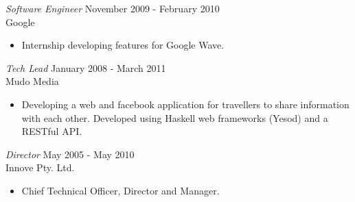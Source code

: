 \documentclass[line,margin]{res}
\begin{document}
\begin{resume}
                {\sl Software Engineer} \hfill November 2009 - February 2010\\
                 Google
                  \begin{itemize}
                       \item Internship developing features for Google Wave.
                   \end{itemize} 

                {\sl Tech Lead} \hfill January 2008 - March 2011\\
                 Mudo Media
                  \begin{itemize}
                       \item Developing a web and facebook application for travellers to share information with each other. Developed using Haskell web frameworks (Yesod) and a RESTful API.
                   \end{itemize} 
             
                {\sl Director} \hfill May 2005 - May 2010\\
                  Innove Pty. Ltd.
                  \begin{itemize}
                       \item Chief Technical Officer, Director and Manager.
                   \end{itemize} 
 

\end{resume}
\end{document}
